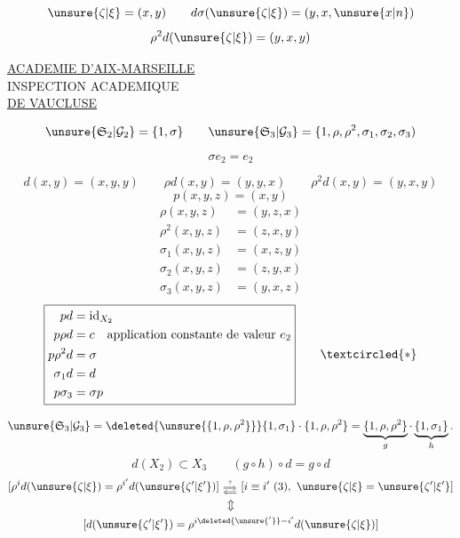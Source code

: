\[
\unsure{\zeta|\xi}=(x,y)\qquad d\sigma(\unsure{\zeta|\xi})=(y,x,\unsure{x|n})
\]
\[
\rho^2d(\unsure{\zeta|\xi})=(y,x,y)
\]


\begin{center}
\uline{ACADEMIE D'AIX-MARSEILLE}\\
INSPECTION ACADEMIQUE\\
\uline{DE VAUCLUSE}
\end{center}

\[
\unsure{\mathfrak S_2|\mathcal G_2}=\{1,\sigma\}\qquad
\unsure{\mathfrak S_3|\mathcal G_3}=\{1,\rho,\rho^2,\sigma_1,\sigma_2,\sigma_3)
\]
\margin{$[\rho^3=1,\inserted{\sigma_i^2=1,}\rho\sigma_i\rho^{-1}=\sigma_{i+1}\quad(\sigma_4=\sigma_1)]$}

\[
\sigma e_2=e_2
\]
\margin{$-$}

\[
d(x,y)=(x,y,y)\qquad\rho d(x,y)=(y,y,x)\qquad\rho^2d(x,y)=(y,x,y)
\]
\[
p(x,y,z)=(x,y)
\]
\[
\begin{aligned}
\rho(x,y,z)&=(y,z,x)\\
\rho^2(x,y,z)&=(z,x,y)\\
\sigma_1(x,y,z)&=(x,z,y)\\
\sigma_2(x,y,z)&=(z,y,x)\\
\sigma_3(x,y,z)&=(y,x,z)
\end{aligned}
\]
\[
\boxed{\begin{aligned}
pd&=\mathrm{id}_{X_2}\\
p\rho d&=c\quad\text{application constante de valeur }e_2\\
p\rho^2d&=\sigma\\
\sigma_1d&=d\\
p\sigma_3&=\sigma p
\end{aligned}}\qquad\textcircled{*}
\]

\[
\unsure{\mathfrak S_3|\mathcal G_3}
=\deleted{\unsure{\{1,\rho,\rho^2\}}}\{1,\sigma_1\}\cdot\{1,\rho,\rho^2\}
=\underbrace{\{1,\rho,\rho^2\}}_g\cdot\underbrace{\{1,\sigma_1\}}_h.
\]
\[
d(X_2)\subset X_3\qquad(g\circ h)\circ d=g\circ d
\]
\[
\begin{gathered}
[\rho^i d(\unsure{\zeta|\xi})=\rho^{i'}d(\unsure{\zeta'|\xi'})]
\ \substack{\overset{?}{\Longrightarrow}\\[-2pt]\Longleftarrow}\
[i\equiv i'\ (3),\ \unsure{\zeta|\xi}=\unsure{\zeta'|\xi'}]\\
\Updownarrow\\
[d(\unsure{\zeta'|\xi'})=\rho^{i\deleted{\unsure{'}}-i'}d(\unsure{\zeta|\xi})]
\end{gathered}
\]

